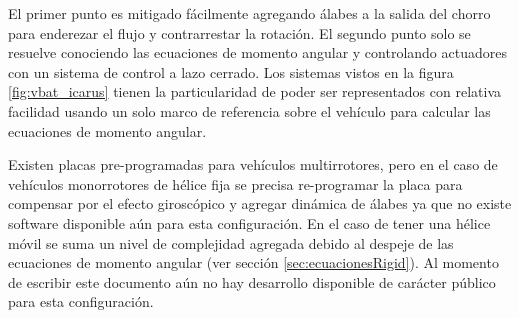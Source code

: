 El primer punto es mitigado fácilmente agregando álabes a la salida del chorro para enderezar el flujo y contrarrestar la rotación. El segundo punto solo se resuelve conociendo las ecuaciones de momento angular y controlando actuadores con un sistema de control a lazo cerrado. Los sistemas vistos en la figura \ref{fig:vbat_icarus} tienen la particularidad de poder ser representados con relativa facilidad usando un solo marco de referencia sobre el vehículo para calcular las ecuaciones de momento angular.

\medskip

Existen placas pre-programadas para vehículos multirrotores, pero en el caso de vehículos monorrotores de hélice fija se precisa re-programar la placa para compensar por el efecto giroscópico y agregar dinámica de álabes ya que no existe software disponible aún para esta configuración. En el caso de tener una hélice móvil se suma un nivel de complejidad agregada debido al despeje de las ecuaciones de momento angular (ver sección \ref{sec:ecuacionesRigid}). Al momento de escribir este documento aún no hay desarrollo disponible de carácter público para esta configuración.
